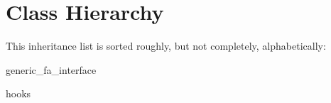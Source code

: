 \section{Class Hierarchy}
This inheritance list is sorted roughly, but not completely, alphabetically\+:\begin{DoxyCompactList}
\item generic\+\_\+fa\+\_\+interface\begin{DoxyCompactList}
\item {}
\end{DoxyCompactList}
\item hooks\begin{DoxyCompactList}
\item {}
\end{DoxyCompactList}
\end{DoxyCompactList}
